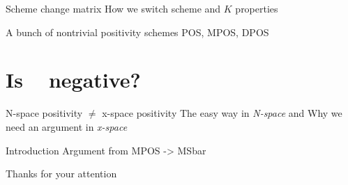 \documentclass[9pt]{beamer}
\DeclareMathOperator{\msbar}{\overline{MS}}
\begin{document}
\begin{frame}{Scheme change matrix}
    How we switch scheme and $K$ properties
\end{frame}

\begin{frame}{A bunch of nontrivial positivity schemes}
    POS, MPOS, DPOS
\end{frame}

\section{Is $\msbar$ negative?}
\begin{frame}{N-space positivity $\neq$ x-space positivity}
    The easy way in \textit{N-space} and Why we need an argument in \textit{x-space}
\end{frame}

\begin{frame}{Introduction}
    Argument from MPOS -> MSbar
\end{frame}


\begin{frame}[standout]
    Thanks for your attention
\end{frame}
\end{document}
